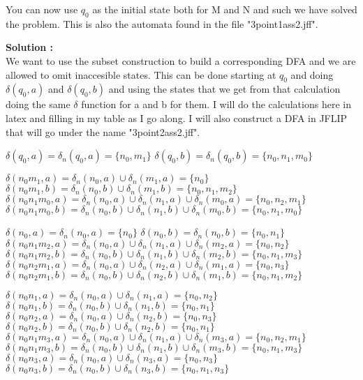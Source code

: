 \documentclass{article}
\newcounter{problem}
\newcounter{solution}
\newcommand\ASolution{%
  \stepcounter{solution}%
  \textbf{Solution \thesolution:}\\%
}
\begin{document}
You can now use $q_0$ as the initial state both for M and N and such we 
have solved the problem. This is also the automata found in the file "3point1ass2.jff".
 
\ASolution We want to use the subset construction to build a 
corresponding DFA and we are allowed to omit inaccesible 
states. This can be done starting at $q_0$ and doing $\delta (q_0, a)$ and $\delta (q_0, 
b)$ and using the states that we get from that calculation doing the same $\delta$ 
function for a and b for them. I will do the calculations here in latex and filling in my 
table as I go along. I will also construct a DFA in JFLIP that will go under the name 
"3point2ass2.jff".

$\delta (q_0, a) = \delta_n (q_0,a) = \{n_0, m_1\}$ \newline
$\delta (q_0, b) = \delta_n (q_0,b) = \{n_0, n_1, m_0\}$

$\delta (n_0m_1, a) = \delta_n (n_0,a) \cup \delta_n (m_1,a) = \{n_0\}$ \newline
$\delta (n_0m_1, b) = \delta_n (n_0,b) \cup \delta_n (m_1,b) = \{n_0,n_1,m_2\}$ \newline
$\delta (n_0n_1m_0, a) = \delta_n (n_0,a) \cup \delta_n (n_1,a) \cup \delta_n (m_0,a) = 
\{n_0, n_2, m_1\}$ \newline
$\delta (n_0n_1m_0, b) = \delta_n (n_0,b) \cup \delta_n (n_1,b) \cup \delta_n (m_0,
b) = \{n_0, n_1, m_0\}$

$\delta (n_0, a) = \delta_n (n_0, a) = \{n_0\}$\newline
$\delta (n_0, b) = \delta_n (n_0, b) = \{n_0, n_1\}$\newline
$\delta (n_0n_1m_2, a) = \delta_n (n_0,a) \cup \delta_n (n_1,a) \cup \delta_n (m_2,
a) = \{n_0, n_2\}$ \newline
$\delta (n_0n_1m_2, b) = \delta_n (n_0,b) \cup \delta_n (n_1,b) \cup \delta_n (m_2,b) = 
\{n_0, n_1, m_3\}$ \newline
$\delta (n_0n_2m_1, a) = \delta_n (n_0,a) \cup \delta_n (n_2, a) \cup \delta_n (m_1,
a) = \{n_0, n_3\}$ \newline
$\delta (n_0n_2m_1, b) = \delta_n (n_0,b) \cup \delta_n (n_2,b) \cup \delta_n (m_1,
b) = \{n_0, n_1, m_2\}$

$\delta (n_0n_1, a) = \delta_n (n_0,a) \cup \delta_n (n_1,a) = \{n_0, n_2\}$ \newline
$\delta (n_0n_1, b) = \delta_n (n_0,b) \cup \delta_n (n_1,b) = \{n_0, n_1\}$ \newline
$\delta (n_0n_2, a) = \delta_n (n_0,a) \cup \delta_n (n_2,b) = \{n_0, n_3\}$ \newline
$\delta (n_0n_2, b) = \delta_n (n_0,b) \cup \delta_n (n_2,b) = \{n_0, n_1\}$ \newline
$\delta (n_0n_1m_3, a) = \delta_n (n_0,a) \cup \delta_n (n_1,a) \cup \delta_n (m_3,a) = 
\{n_0, n_2, m_1\}$ \newline
$\delta (n_0n_1m_3, b) = \delta_n (n_0,b) \cup \delta_n (n_1,b) \cup \delta_n (m_3,b) = 
\{n_0, n_1, m_3\}$ \newline
$\delta (n_0n_3, a) = \delta_n (n_0,a) \cup \delta_n (n_3,a) = \{n_0, n_3\}$ \newline
$\delta (n_0n_3, b) = \delta_n (n_0,b) \cup \delta_n (n_3,b) = \{n_0, n_1, n_3\}$
\end{document}
